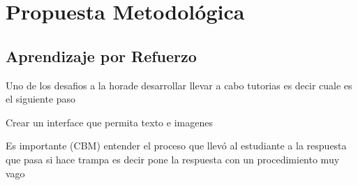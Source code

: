 
\chapter{Propuesta Metodológica}

\section{Aprendizaje por Refuerzo}

Uno de los desafios a la horade desarrollar  llevar a cabo tutorias es decir cuale es el siguiente paso

Crear un interface que permita texto e imagenes

Es importante (CBM) entender el proceso que llevó al estudiante a la respuesta que pasa si hace trampa es decir pone la respuesta con un procedimiento muy vago
